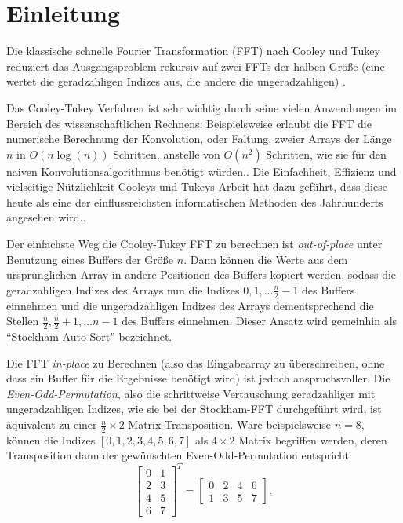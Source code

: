 \documentclass[10pt]{article}
\begin{document}
\section*{Einleitung}
Die klassische schnelle Fourier Transformation (FFT) nach Cooley und Tukey 
reduziert das Ausgangsproblem rekursiv auf zwei FFTs der halben Größe (eine wertet die 
geradzahligen Indizes aus, die andere die ungeradzahligen) \cite{cooley:algorithm}. 

Das Cooley-Tukey Verfahren ist sehr wichtig durch seine vielen Anwendungen im Bereich des 
wissenschaftlichen Rechnens: Beispielsweise erlaubt die FFT die numerische Berechnung der 
Konvolution, oder Faltung, zweier Arrays der Länge $n$ in $O(n \log(n))$ Schritten, anstelle von 
$O(n^2)$ Schritten, wie sie für den naiven Konvolutionsalgorithmus benötigt würden.\cite{proakis:introduction}. 
Die Einfachheit, Effizienz und vielseitige Nützlichkeit Cooleys und Tukeys Arbeit hat dazu geführt, 
dass diese heute als eine der einflussreichsten informatischen Methoden des  
Jahrhunderts angesehen wird.\cite{cipra:best}.

Der einfachste Weg die Cooley-Tukey FFT zu berechnen ist {\it out-of-place} unter 
Benutzung eines Buffers der Größe $n$. Dann können die Werte aus dem ursprünglichen Array in andere 
Positionen des Buffers kopiert werden, sodass die geradzahligen Indizes des Arrays nun die Indizes $0, 1, \ldots
\frac{n}{2}-1$ des Buffers einnehmen und die ungeradzahligen Indizes des Arrays dementsprechend die 
Stellen $\frac{n}{2}, \frac{n}{2}+1, \ldots n-1$ des Buffers einnehmen.
Dieser Ansatz wird gemeinhin als ``Stockham Auto-Sort''\cite{cochran:fast} bezeichnet.

Die FFT {\it in-place} zu Berechnen (also das Eingabearray zu überschreiben, 
ohne dass ein Buffer für die Ergebnisse benötigt wird) ist jedoch anspruchsvoller.
Die {\it Even-Odd-Permutation}, also die schrittweise Vertauschung geradzahliger mit ungeradzahligen Indizes, 
wie sie bei der Stockham-FFT durchgeführt wird, ist äquivalent zu einer $\frac{n}{2} \times 2$ 
Matrix-Transposition. Wäre beispielsweise $n=8$, können die Indizes $[0, 1, 2, 3, 4, 5, 6, 7]$ 
als $4 \times 2$ Matrix begriffen werden, deren Transposition dann der gewünschten Even-Odd-Permutation entspricht:
\[ 
\left[
  \begin{matrix}
    0 & 1\\
    2 & 3\\
    4 & 5\\
    6 & 7
  \end{matrix}
\right]^T = 
\left[
  \begin{matrix}
    0 & 2 & 4 & 6\\
    1 & 3 & 5 & 7
  \end{matrix}
\right],
\]
\end{document}
